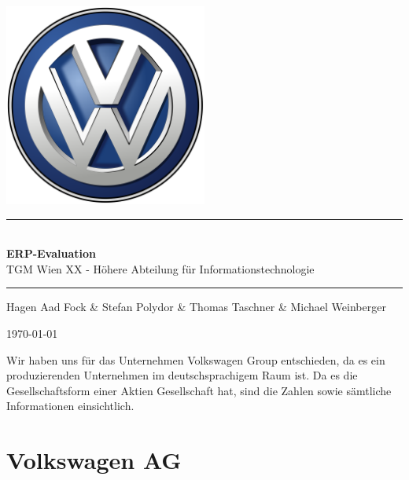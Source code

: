 \documentclass[12pt]{article}
\begin{document}
\begin{titlepage}
\begin{center}
\includegraphics[width=0.5\textwidth]{images/vwlogo}\\[1cm]    


\rule{1.0\textwidth}{1mm}
{ \huge \bfseries \\[0.4cm]  \huge ERP-Evaluation \\[0.4cm] }
\LARGE TGM Wien XX - Höhere Abteilung für Informationstechnologie  \\[0.4cm]

\rule{1.0\textwidth}{1mm}




\noindent 
\vspace{3cm}

\begin{center}
\large
Hagen Aad Fock \&
Stefan Polydor \&
Thomas Taschner \&
Michael Weinberger
\end{center}

\vfill

{\large \today}

\end{center}
\end{titlepage}

\tableofcontents


\ohead{\headmark}

\newpage

\noindent
Wir haben uns für das Unternehmen Volkswagen Group entschieden, da es ein produzierenden Unternehmen im deutschsprachigem Raum ist. Da es die Gesellschaftsform einer Aktien Gesellschaft hat, sind die Zahlen sowie sämtliche Informationen einsichtlich. 
\section{Volkswagen AG}
\end{document}
